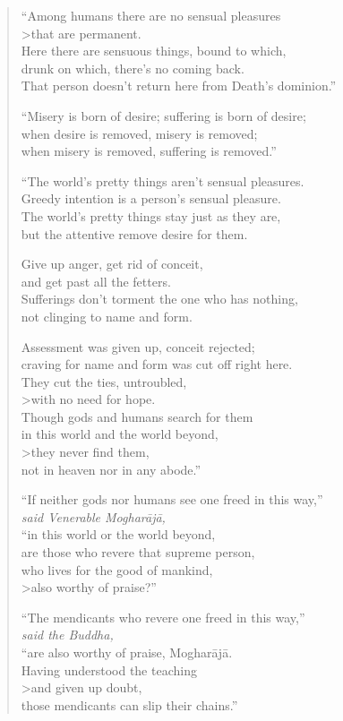 \documentclass[12pt,openany]{book}%
\newcommand*{\scspeaker}[1]{\hspace{2em}\textit{#1}}
\begin{document}
\begin{verse}%
“Among humans there are no sensual pleasures  \\>that are permanent. \\
Here there are sensuous things, bound to which, \\
drunk on which, there’s no coming back. \\
That person doesn’t return here from Death’s dominion.” 

“Misery is born of desire; suffering is born of desire; \\
when desire is removed, misery is removed; \\
when misery is removed, suffering is removed.” 

“The world’s pretty things aren’t sensual pleasures. \\
Greedy intention is a person’s sensual pleasure. \\
The world’s pretty things stay just as they are, \\
but the attentive remove desire for them. 

Give up anger, get rid of conceit, \\
and get past all the fetters. \\
Sufferings don’t torment the one who has nothing, \\
not clinging to name and form. 

Assessment was given up, conceit rejected; \\
craving for name and form was cut off right here. \\
They cut the ties, untroubled, \\>with no need for hope. \\
Though gods and humans search for them \\
in this world and the world beyond,  \\>they never find them, \\
not in heaven nor in any abode.” 

“If neither gods nor humans see one freed in this way,” \\
\scspeaker{said Venerable \textsanskrit{Mogharājā}, }\\
“in this world or the world beyond, \\
are those who revere that supreme person, \\
who lives for the good of mankind,  \\>also worthy of praise?” 

“The mendicants who revere one freed in this way,” \\
\scspeaker{said the Buddha, }\\
“are also worthy of praise, \textsanskrit{Mogharājā}. \\
Having understood the teaching  \\>and given up doubt, \\
those mendicants can slip their chains.” 

%
\end{verse}
\end{document}
